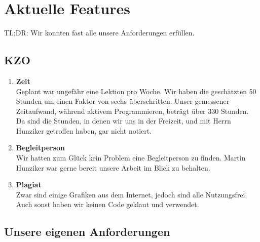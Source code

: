 
\chapter{Aktuelle Features}
TL;DR: Wir konnten fast alle unsere Anforderungen erfüllen.

\section{KZO}
\begin{enumerate}
    \item \textbf{Zeit} \\
        Geplant war ungefähr eine Lektion pro Woche. Wir haben die geschätzten 50 Stunden um einen Faktor von sechs überschritten. Unser gemessener Zeitaufwand, während aktivem Programmieren,
        beträgt über 330 Stunden. Da sind die Stunden, in denen wir uns in der Freizeit, und mit Herrn Hunziker getroffen haben, gar nicht notiert.
    \item \textbf{Begleitperson} \\
        Wir hatten zum Glück kein Problem eine Begleitperson zu finden. Martin Hunziker war gerne bereit unsere Arbeit im Blick zu behalten.
    \item \textbf{Plagiat} \\
        Zwar sind einige Grafiken aus dem Internet, jedoch sind alle Nutzungsfrei. Auch sonst haben wir keinen Code geklaut und verwendet. 
\end{enumerate}

\section{Unsere eigenen Anforderungen}

